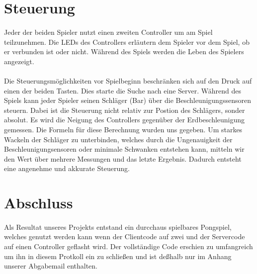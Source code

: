 \section*{Steuerung}

\paragraph*{}
Jeder der beiden Spieler nutzt einen zweiten Controller um am Spiel teilzunehmen. Die LEDs des Controllers erläutern dem Spieler vor dem Spiel, ob er verbunden ist oder nicht. Während des Spiels werden die Leben des Spielers angezeigt. 

\paragraph*{}
Die Steuerungsmöglichkeiten vor Spielbeginn beschränken sich auf den Druck auf einen der beiden Tasten. Dies starte die Suche nach eine Server. Während des Spiels kann jeder Spieler seinen Schläger (Bar) über die Beschleunigungssensoren steuern. Dabei ist die Steuerung nicht relativ zur Postion des Schlägers, sonder absolut. Es wird die Neigung des Controllers gegenüber der Erdbeschleunigung gemessen. Die Formeln für diese Berechnung wurden uns gegeben. Um starkes Wackeln der Schläger zu unterbinden, welches durch die Ungenauigkeit der Beschleunigungsensoren oder minimale Schwanken entstehen kann, mitteln wir den Wert über mehrere Messungen und das letzte Ergebnis. Dadurch entsteht eine angenehme und akkurate Steuerung.

\section*{Abschluss}

\paragraph*{}
Als Resultat unseres Projekts entstand ein durcchaus spielbares Pongspiel, welches genutzt werden kann wenn der Clientcode auf zwei und der Servercode auf einen Controller geflasht wird. Der vollständige Code erschien zu umfangreich um ihn in diesem Protkoll ein zu schließen und ist deßhalb nur im Anhang unserer Abgabemail enthalten.


